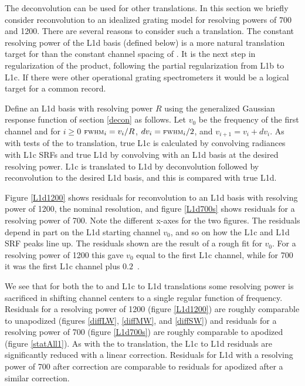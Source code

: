 \documentclass[10pt,twocolumn]{article}
\begin{document}

The {\airs} deconvolution can be used for other translations.  
In this section we briefly consider reconvolution to an idealized
grating model for resolving powers of 700 and 1200.  There are
several reasons to consider such a translation.  The constant
resolving power of the L1d basis (defined below) is a more natural
translation target for {\airs} than the constant channel spacing of
{\cris}.  It is the next step in regularization of the {\airs}
product, following the partial regularization from L1b to L1c.  
If there were other operational grating spectrometers it would be
a logical target for a common record.

Define an {\airs} L1d basis with resolving power $R$ using the
generalized Gaussian response function of section \ref{decon} as
follows.  Let $v_0$ be the frequency of the first channel and for
$i\ge0$ $\mbox{\small\textsc{fwhm}}_i = v_i / R$, $dv_i = \mbox{\small\textsc{fwhm}}_i / 2$, and $v_{i+1} =
v_i + dv_i$.  As with tests of the {\airs} to {\cris} translation,
true L1c is calculated by convolving {\kcarta} radiances with
{\airs} L1c SRFs and true L1d by convolving with an L1d basis at the
desired resolving power.  L1c is translated to L1d by deconvolution
followed by reconvolution to the desired L1d basis, and this is
compared with true L1d.

Figure \ref{L1d1200} shows residuals for reconvolution to an L1d
basis with resolving power of 1200, the nominal {\airs} resolution,
and figure \ref{L1d700s} shows residuals for a resolving power of
700.  Note the different x-axes for the two figures.  The residuals
depend in part on the L1d starting channel $v_0$, and so on how the
L1c and L1d SRF peaks line up.  The residuals shown are the result
of a rough fit for $v_0$.  For a resolving power of 1200 this gave
$v_0$ equal to the first L1c channel, while for 700 it was the first
L1c channel plus $0.2$~\wn.

We see that for both the {\airs} to {\cris} and L1c to L1d
translations some resolving power is sacrificed in shifting channel
centers to a single regular function of frequency.  Residuals for a
resolving power of 1200 (figure \ref{L1d1200}) are roughly
comparable to unapodized {\cris} (figures \ref{diffLW},
\ref{diffMW}, and \ref{diffSW}) and residuals for a resolving power
of 700 (figure \ref{L1d700s}) are roughly comparable to apodized
{\cris} (figure \ref{statAll1}).  As with the {\airs} to {\cris}
translation, the L1c to L1d residuals are significantly reduced with
a linear correction.  Residuals for L1d with a resolving power of
700 after correction are comparable to residuals for apodized
{\cris} after a similar correction.
\end{document}
